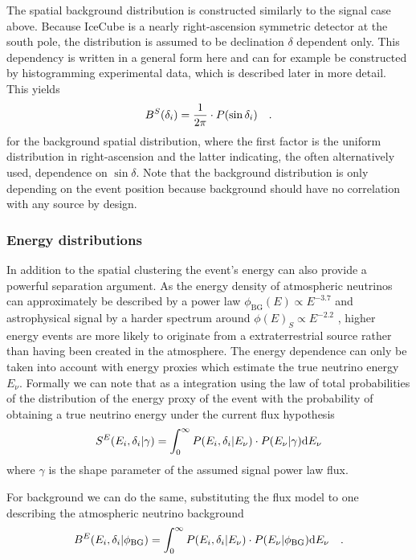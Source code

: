 The spatial background distribution is constructed similarly to the signal case above.
Because IceCube is a nearly right-ascension symmetric detector at the south pole, the distribution is assumed to be declination $\delta$ dependent only.
This dependency is written in a general form here and can for example be constructed by histogramming experimental data, which is described later in more detail.
This yields
\begin{equation}
  B^S(\delta_i) = \frac{1}{2\pi} \cdot P(\sin\delta_i)
  \quad\text{.}
\end{equation}
for the background spatial distribution, where the first factor is the uniform distribution in right-ascension and the latter indicating, the often alternatively used, dependence on $\sin\delta$.
Note that the background distribution is only depending on the event position because background should have no correlation with any source by design.

\subsubsection*{Energy distributions}
In addition to the spatial clustering the event's energy can also provide a powerful separation argument.
As the energy density of atmospheric neutrinos can approximately be described by a power law $\phi_\mathrm{BG}(E) \propto E^{-3.7}$ and astrophysical signal by a harder spectrum around $\phi(E)_S \propto E^{-2.2}$ , higher energy events are more likely to originate from a extraterrestrial source rather than having been created in the atmosphere.
The energy dependence can only be taken into account with energy proxies which estimate the true neutrino energy $E_\nu$.
Formally we can note that as a integration using the law of total probabilities of the distribution of the energy proxy of the event with the probability of obtaining a true neutrino energy under the current flux hypothesis
\begin{equation}
  S^E(E_i, \delta_i|\gamma) =
    \int_0^\infty P(E_i,\delta_i|E_\nu)\cdot P(E_\nu|\gamma) \mathrm{d}E_\nu
\end{equation}
where $\gamma$ is the shape parameter of the assumed signal power law flux.

For background we can do the same, substituting the flux model to one describing the atmospheric neutrino background
\begin{equation}
  B^E(E_i, \delta_i|\phi_\mathrm{BG}) =
    \int_0^\infty P(E_i,\delta_i|E_\nu)\cdot P(E_\nu|\phi_\mathrm{BG}) \mathrm{d}E_\nu
    \quad\text{.}
\end{equation}

